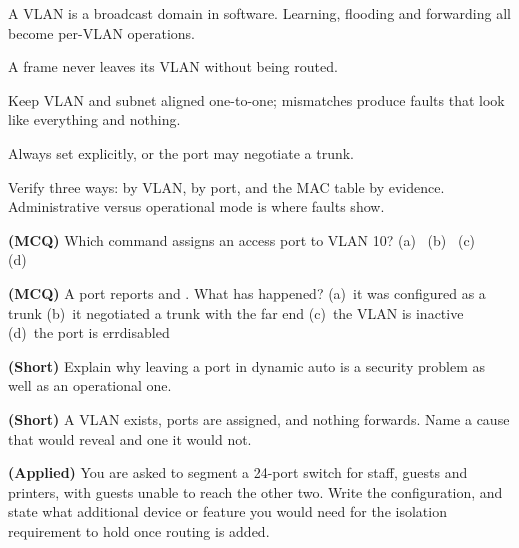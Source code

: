 \begin{chaptersummary}
\begin{tight}
  \item A VLAN is a broadcast domain in software. Learning, flooding and
        forwarding all become per-VLAN operations.
  \item A frame never leaves its VLAN without being routed.
  \item Keep VLAN and subnet aligned one-to-one; mismatches produce faults that
        look like everything and nothing.
  \item Always set  explicitly, or the port may
        negotiate a trunk.
  \item Verify three ways:  by VLAN,
         by port, and the MAC table by evidence.
        Administrative versus operational mode is where faults show.
\end{tight}
\end{chaptersummary}

\begin{reviewq}
  \item \textbf{(MCQ)} Which command assigns an access port to VLAN 10?
        (a)~ (b)~
        (c)~ (d)~
  \item \textbf{(MCQ)} A port reports  and
        . What has happened?
        (a)~it was configured as a trunk (b)~it negotiated a trunk with the far
        end (c)~the VLAN is inactive (d)~the port is errdisabled
  \item \textbf{(Short)} Explain why leaving a port in dynamic auto is a security
        problem as well as an operational one.
  \item \textbf{(Short)} A VLAN exists, ports are assigned, and nothing forwards.
        Name a cause that  would reveal and one it would not.
  \item \textbf{(Applied)} You are asked to segment a 24-port switch for staff,
        guests and printers, with guests unable to reach the other two. Write the
        configuration, and state what additional device or feature you would need
        for the isolation requirement to hold once routing is added.
\end{reviewq}

